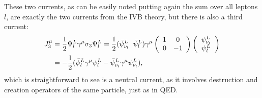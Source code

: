 These two currents, as can be easily noted putting again the sum over all leptons $l$, are exactly the two currents from the IVB theory, but there is also a third current:
\begin{align*}
    J^{\mu}_3 &= \dfrac{1}{2}\Bar{\Psi}^L_l\gamma^{\mu}\sigma_3\Psi^L_l = \dfrac{1}{2}(\Bar{\psi}^L_{\nu_l} \;\; \Bar{\psi}^L_l)\gamma^{\mu}\left( \begin{array}{ccc}
1 & 0 \\
0 & -1 \end{array} \right)  \left( \begin{array}{c}
    \psi^L_{\nu_l} \\
    \psi^L_l\end{array} \right) \\
    &= -\dfrac{1}{2}(\Bar{\psi}^L_l\gamma^{\mu}\psi^L_l - \Bar{\psi}^L_{\nu_l}\gamma^{\mu}\psi^L_{\nu_l}),
\end{align*}
which is straightforward to see is a neutral current, as it involves destruction and creation operators of the same particle, just as in QED.